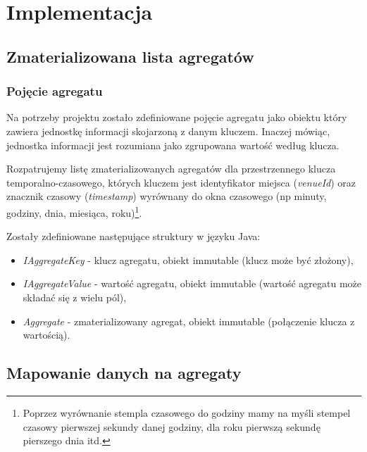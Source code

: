 \section{Implementacja}

\subsection{Zmaterializowana lista agregatów}
\subsubsection{Pojęcie agregatu}

Na potrzeby projektu zostało zdefiniowane pojęcie agregatu jako obiektu który zawiera jednostkę informacji skojarzoną z danym kluczem. Inaczej mówiąc, jednostka informacji jest rozumiana jako zgrupowana wartość według klucza.

Rozpatrujemy listę zmaterializowanych agregatów dla przestrzennego klucza temporalno-czasowego, których kluczem jest identyfikator miejsca (\emph{venueId}) oraz znacznik czasowy (\emph{timestamp}) wyrównany do okna czasowego (np minuty, godziny, dnia, miesiąca, roku)\footnote{Poprzez wyrównanie stempla czasowego do godziny mamy na myśli stempel czasowy pierwszej sekundy danej godziny, dla roku pierwszą sekundę pierszego dnia itd.}.

Zostały zdefiniowane następujące struktury w języku Java:

\begin{itemize}[noitemsep]
  \item \emph{IAggregateKey} - klucz agregatu, obiekt immutable (klucz może być złożony),
  \item \emph{IAggregateValue} - wartość agregatu, obiekt immutable (wartość agregatu może składać się z wielu pól),
  \item \emph{Aggregate} - zmaterializowany agregat, obiekt immutable (połączenie klucza z wartością).
\end{itemize}







\subsection{Mapowanie danych na agregaty}

